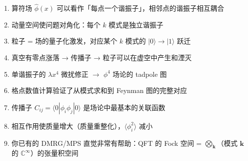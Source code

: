 \documentclass[12pt,a4paper]{article}
\begin{document}
\begin{enumerate}[nosep]
\item 算符场 $\hat\phi(x)$ 可以看作「每点一个谐振子」，相邻点的谐振子相互耦合
\item 动量空间使问题对角化：每个 $k$ 模式是独立谐振子
\item 粒子 = 场的量子化激发，对应某个 $k$ 模式的 $|0\rangle \to |1\rangle$ 跃迁
\item 真空有零点涨落 → 传播子 → 粒子可以在虚空中产生和湮灭
\item 单谐振子的 $\lambda x^4$ 微扰修正 $\to$ $\phi^4$ 场论的 tadpole 图
\item 格点数值计算验证了从模式求和到 Feynman 图的完整对应
\item 传播子 $C_{ij} = \langle 0|\phi_i\phi_j|0\rangle$ 是场论中最基本的关联函数
\item 相互作用使质量增大（质量重整化），$\langle\phi_i^2\rangle$ 减小
\item 你已有的 DMRG/MPS 直觉非常有帮助：QFT 的 Fock 空间 =\newline
$\bigotimes_{\mathbf{k}}$（模式 $\mathbf{k}$ 的 $\mathbb{C}^\infty$）的张量积空间
\end{enumerate}
\end{document}
